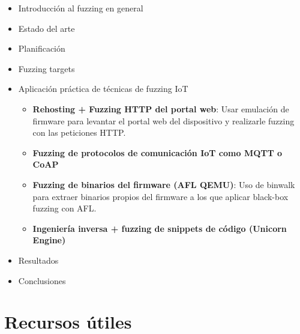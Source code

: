 \documentclass[11pt, a4paper, openany]{book}
\begin{document}
    \begin{itemize}
        \item Introducción al fuzzing en general
        \item Estado del arte
        \item Planificación
        \item Fuzzing targets
        \item Aplicación práctica de técnicas de fuzzing IoT
        \begin{itemize}
            \item \textbf{Rehosting + Fuzzing HTTP del portal web}: Usar emulación de firmware
            para levantar el portal web del dispositivo y realizarle fuzzing con las peticiones HTTP.
            \item \textbf{Fuzzing de protocolos de comunicación IoT como MQTT o CoAP}
            \item \textbf{Fuzzing de binarios del firmware (AFL QEMU)}: Uso de binwalk para extraer
            binarios propios del firmware a los que aplicar black-box fuzzing con AFL.
            \item \textbf{Ingeniería inversa + fuzzing de snippets de código (Unicorn Engine)}
        \end{itemize}
        \item Resultados
        \item Conclusiones
    \end{itemize}

    \section{Recursos útiles}
\end{document}
